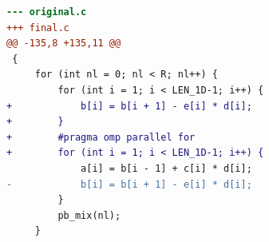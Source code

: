 \begin{lstlisting}[language=diff,basicstyle=\ttfamily\scriptsize,breaklines=true,caption={tsvc/s211 — parallel-not-faster (e1_smoke5)}]
--- original.c
+++ final.c
@@ -135,8 +135,11 @@
 {
     for (int nl = 0; nl < R; nl++) {
         for (int i = 1; i < LEN_1D-1; i++) {
+            b[i] = b[i + 1] - e[i] * d[i];
+        }
+        #pragma omp parallel for 
+        for (int i = 1; i < LEN_1D-1; i++) {
             a[i] = b[i - 1] + c[i] * d[i];
-            b[i] = b[i + 1] - e[i] * d[i];
         }
         pb_mix(nl);
     }
\end{lstlisting}
